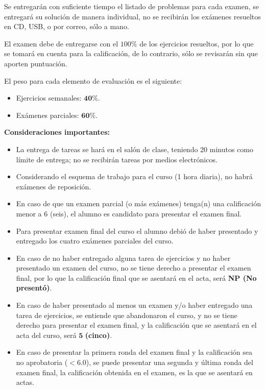 \documentclass[12pt]{article}
\begin{document}
Se entregarán con suficiente tiempo el listado de problemas para cada examen, se entregará su solución de manera individual, no se recibirán los exámenes resueltos en CD, USB, o por correo, sólo a mano.
\par
El examen debe de entregarse con el $100\%$ de los ejercicios resueltos, por lo que se tomará en cuenta para la calificación, de lo contrario, sólo se revisarán sin que aporten puntuación.
\par
El peso para cada elemento de evaluación es el siguiente:
\begin{itemize}
\setlength{\itemsep}{0mm}
\item Ejercicios semanales: $\mathbf{40\%}$.
\item Exámenes parciales: $\mathbf{60\%}$.
\end{itemize}
\textbf{Consideraciones importantes:}
\begin{itemize}
\setlength{\itemsep}{0mm}
\item La entrega de tareas se hará en el salón de clase, teniendo 20 minutos como límite de entrega; no se recibirán tareas por medios electrónicos.
\item Considerando el esquema de trabajo para el curso (1 hora diaria), no habrá exámenes de reposición.
\item En caso de que un examen parcial (o más exámenes) tenga(n) una calificación menor a $6$ (seis), el alumno es candidato para presentar el examen final.
\item Para presentar examen final del curso el alumno debió de haber presentado y entregado los cuatro exámenes parciales del curso.
\item En caso de no haber entregado alguna tarea de ejercicios y no haber presentado un examen del curso, no se tiene derecho a presentar el examen final, por lo que la calificación final que se asentará en el acta, será \textbf{NP (No presentó)}.
\item En caso de haber presentado al menos un examen y/o haber entregado una tarea de ejercicios, se entiende que abandonaron el curso, y no se tiene derecho para presentar el examen final, y la calificación que se asentará en el acta del curso, será $\mathbf{5}$ \textbf{(cinco)}.
\item En caso de presentar la primera ronda del examen final y la calificación sea no aprobatoria ($<6.0$), se puede presentar una segunda y última ronda del examen final, la calificación obtenida en el examen, es la que se asentará en actas.
\end{itemize}
\end{document}
